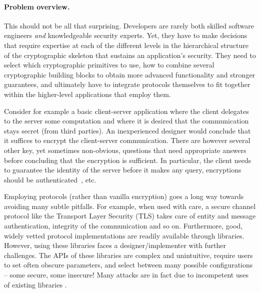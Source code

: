 \documentclass[10pt]{article}
\begin{document}
\paragraph*{Problem overview.}

This should not be all that surprising.   Developers are rarely both skilled software engineers \emph{and} knowledgeable security experts.
Yet, they have to make decisions that require expertise at each of the different levels in the hierarchical structure of the cryptographic skeleton that sustains an application's security.
They need to select which cryptographic primitives to use, how to combine several cryptographic building blocks to obtain more advanced functionality and stronger guarantees, and ultimately have to integrate protocols themselves to fit together within the higher-level applications that employ them.


Consider for example a basic client-server application where the client delegates to the server some computation and where it is desired that the communication stays secret (from third parties).
An inexperienced designer would conclude that it suffices to encrypt the client-server communication. 
There are however several other key, yet sometimes non-obvious, questions that need appropriate answers before concluding that the encryption is sufficient. 
In particular, the client needs to guarantee the identity of the server before it makes any query, encryptions should be authenticated~\cite{BN08}, etc.

Employing protocols (rather than vanilla encryption) goes a long way towards avoiding many subtle pitfalls.  
For example, when used with care, a secure channel protocol like the Transport Layer Security (TLS) takes care of entity and message authentication, integrity of the communication and so on.  Furthermore, good, widely vetted protocol implementations are readily available through libraries. 
However, using these libraries faces a designer/implementer with further challenges.   The APIs of these libraries are complex and unintuitive, require users to set often obscure parameters, and select between many possible configurations -- some secure, some insecure!  Many attacks are in fact due to incompetent uses of existing libraries  \cite{GIJABS12}. 
\end{document}
